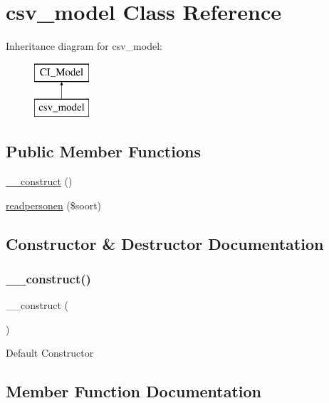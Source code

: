 \hypertarget{classcsv__model}{}\section{csv\+\_\+model Class Reference}
\label{classcsv__model}
Inheritance diagram for csv\+\_\+model\+:\begin{figure}[H]
\begin{center}
\leavevmode
\includegraphics[height=2.000000cm]{classcsv__model}
\end{center}
\end{figure}
\subsection*{Public Member Functions}
\begin{DoxyCompactItemize}
\item 
\mbox{\hyperlink{classcsv__model_a095c5d389db211932136b53f25f39685}{\+\_\+\+\_\+construct}} ()
\item 
\mbox{\hyperlink{classcsv__model_a0982b277c56508192bc564cd095e9541}{readpersonen}} (\$soort)
\end{DoxyCompactItemize}


\subsection{Constructor \& Destructor Documentation}
\mbox{\label{classcsv__model_a095c5d389db211932136b53f25f39685}} 
\subsubsection{\texorpdfstring{\+\_\+\+\_\+construct()}{\_\_construct()}}
{\footnotesize\ttfamily \+\_\+\+\_\+construct (\begin{DoxyParamCaption}{ }\end{DoxyParamCaption})}

Default Constructor 

\subsection{Member Function Documentation}
\mbox{\label{classcsv__model_a0982b277c56508192bc564cd095e9541}} 
